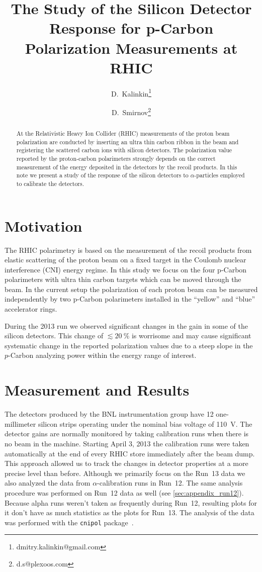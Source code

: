 \documentclass[a4paper,12pt]{article}
\title{The Study of the Silicon Detector Response for p-Carbon Polarization Measurements at RHIC}
\author[1]{D.~Kalinkin\thanks{dmitry.kalinkin@gmail.com}}
\author[2]{D.~Smirnov\thanks{d.s@plexoos.com}}
\affil[1]{Institute for Theoretical and Experimental Physics}
\affil[2]{Brookhaven National Laboratory}
\begin{document}
\maketitle

\begin{abstract}

At the Relativistic Heavy Ion Collider (RHIC) measurements of the proton beam
polarization are conducted by inserting an ultra thin carbon ribbon in the beam
and registering the scattered carbon ions with silicon detectors. The
polarization value reported by the proton-carbon polarimeters strongly depends
on the correct measurement of the energy deposited in the detectors by the
recoil products. In this note we present a study of the response of the silicon
detectors to $\alpha$-particles employed to calibrate the detectors.

\end{abstract}


\section{Motivation}

The RHIC polarimetry is based on the measurement of the recoil products from
elastic scattering of the proton beam on a fixed target in the Coulomb nuclear
interference (CNI) energy regime. In this study we focus on the four p-Carbon
polarimeters with ultra thin carbon targets which can be moved through
the beam. In the current setup the polarization of each proton beam can be
measured independently by two p-Carbon polarimeters installed in the ``yellow''
and ``blue'' accelerator rings.

During the 2013 run we observed significant changes in the gain in some of the
silicon detectors. This change of $\lesssim 20~\%$ is worrisome and may cause
significant systematic change in the reported polarization values due to a steep
slope in the $p$-Carbon analyzing power within the energy range of interest.


\section{Measurement and Results}

The detectors produced by the BNL instrumentation group have 12 one-millimeter
silicon strips operating under the nominal bias voltage of 110~V. The detector
gains are normally monitored by taking calibration runs when there is no beam in
the machine. Starting April 3, 2013 the calibration runs were taken
automatically at the end of every RHIC store immediately after the beam dump.
This approach allowed us to track the changes in detector properties at a more
precise level than before. Although we primarily focus on the Run~13 data we
also analyzed the data from $\alpha$-calibration runs in Run~12. The same analysis
procedure was performed on Run~12 data as well (see \cref{sec:appendix_run12}).
Because alpha runs weren't taken as frequently during Run~12, resulting plots for
it don't have as much statistics as the plots for Run~13.
The analysis of the data was performed with the {\tt cnipol} package~\cite{cnipol_code}.
\end{document}
